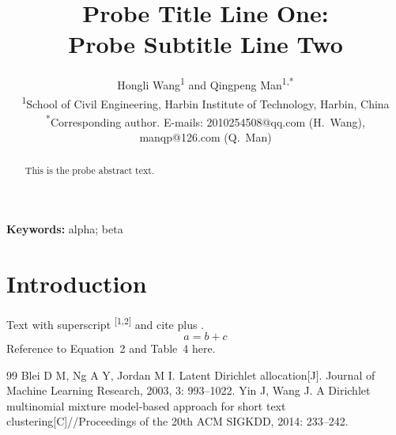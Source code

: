 \documentclass{article}
\title{\bfseries Probe Title Line One:\\Probe Subtitle Line Two}
\author{Hongli Wang\textsuperscript{1} and Qingpeng Man\textsuperscript{1,*}\\[6pt]
\small\textsuperscript{1}School of Civil Engineering, Harbin Institute of Technology, Harbin, China\\
\small\textsuperscript{*}Corresponding author. E-mails: 2010254508@qq.com (H.~Wang), manqp@126.com (Q.~Man)}
\date{}
\begin{document}
\maketitle
\begin{abstract}
This is the probe abstract text.
\end{abstract}
\noindent\textbf{Keywords:} alpha; beta
\section{Introduction}
Text with superscript \textsuperscript{[1,2]} and cite \cite{blei2003lda} plus \cite{yin2014gsdmm,srivastava2017avitm}.
\begin{equation}
a = b + c \tag{3}
\end{equation}
Reference to Equation~2 and Table~4 here.
\begin{thebibliography}{99}
 Blei D M, Ng A Y, Jordan M I. Latent Dirichlet allocation[J]. Journal of Machine Learning Research, 2003, 3: 993--1022.
 Yin J, Wang J. A Dirichlet multinomial mixture model-based approach for short text clustering[C]//Proceedings of the 20th ACM SIGKDD, 2014: 233--242.
\end{thebibliography}
\end{document}
